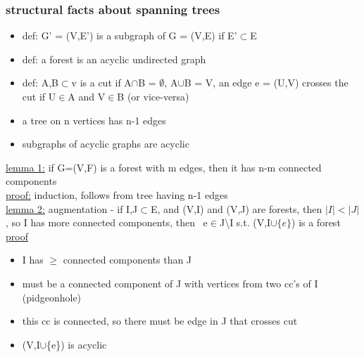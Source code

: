 \documentclass[a4paper]{article}
\newcommand{\bi}{\begin{itemize}}
\newcommand{\ei}{\end{itemize}}
\begin{document}
{      \subsubsection{structural facts about spanning trees}
        \bi
          \item def: G' = (V,E') is a subgraph of G = (V,E) if E'$\subset$E
          \item def: a forest is an acyclic undirected graph
          \item def: A,B$\subset$v is a cut if A$\cap$B = $\emptyset$, A$\cup$B
          = V, an edge e = (U,V) crosses the cut if U$\in$A and V$\in$B (or
          vice-versa)
          \item a tree on n vertices has n-1 edges
          \item subgraphs of acyclic graphs are acyclic
        \ei
        \underline{lemma 1:} if G=(V,F) is a forest with m edges, then it has
        n-m connected components\\
        \underline{proof:} induction, follows from tree having n-1 edges\\
        \underline{lemma 2:} augmentation - if I,J$\subset$E, and (V,I) and
        (V,J) are forests, then $|I|<|J|$, so I has more connected components,
        then \te\ e$\in$J\backslash I s.t. (V,I$\cup\{e\}$) is a forest\\
        \underline{proof}
        \bi
          \item I has $\geq$ connected components than J
          \item must be a connected component of J with vertices from two cc's
          of I (pidgeonhole)
          \item this cc is connected, so there must be edge in J that crosses
          cut
          \item (V,I$\cup$\{e\}) is acyclic
        \ei
}
\end{document}
